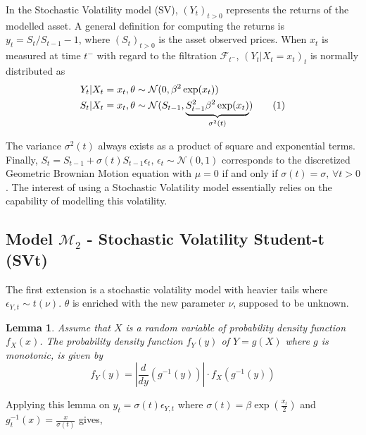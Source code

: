 \documentclass[11pt,a4,twosided,singlespacing,titlepagenumber=on]{scrreprt}
\numberwithin{equation}{chapter} %
\newtheorem{lemma}[theorem]{Lemma}%
\theoremstyle{remark}
\newcommand\numberthis{\addtocounter{equation}{1}\tag{\theequation}}
\begin{document}
In the Stochastic Volatility model (SV), $(Y_t)_{t>0}$ represents the returns of the modelled asset. A general definition for computing the returns is $y_t = S_t / S_{t-1} - 1$, where $(S_t)_{t>0}$ is the asset observed prices. When $x_t$ is measured at time $t^-$ with regard to the filtration $\mathcal{F}_{t^-}$, $(Y_t|X_t = x_t)_t$ is normally distributed as
\begin{align*}
Y_t | X_t = x_t, \theta 					&\sim \mathcal{N}(0, \beta^2 \exp(x_t)) \\
S_t | X_t = x_t, \theta 					&\sim \mathcal{N}(S_{t-1}, \underbrace{S_{t-1}^2 \beta^2 \exp(x_t)}_{\sigma^2(t)}) \numberthis \label{cond_dist_sv_model}
\end{align*}


 The variance $\sigma^2(t)$ always exists as a product of square and exponential terms. Finally, $S_t = S_{t-1} + \sigma(t) S_{t-1} \epsilon_t \text{, } \epsilon_t \sim \mathcal{N}(0,1)$ corresponds to the discretized Geometric Brownian Motion equation with $\mu = 0$ if and only if $\sigma(t) = \sigma \text{, } \forall t > 0$. The interest of using a Stochastic Volatility model essentially relies on the capability of modelling this volatility.

\subsection{Model $\mathcal{M}_2$ - Stochastic Volatility Student-t (SVt)}
The first extension is a stochastic volatility model with heavier tails where $\epsilon_{Y,t} \sim t(\nu)$. $\theta$ is enriched with the new parameter $\nu$, supposed to be unknown.

\begin{lemma}
\textit{
Assume that $X$ is a random variable of probability density function $f_X(x)$. The probability density function $f_Y(y)$ of $Y=g(X)$ where $g$ is monotonic, is given by
}
\begin{equation}
f_Y(y) = \left|\frac{d}{dy}(g^{-1}(y))\right| \cdot f_X(g^{-1}(y))
\end{equation}
\end{lemma}


Applying this lemma on $y_t = \sigma(t) \epsilon_{Y,t}$ where $\sigma(t) = \beta \exp \left(\frac{x_t}{2} \right)$ and $g^{-1}_t(x) = \frac{x}{\sigma(t)}$ gives,
\end{document}
